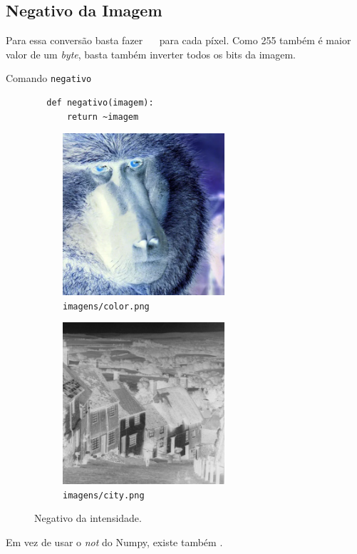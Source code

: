 \subsection{Negativo da Imagem}

Para essa conversão basta fazer ~~ para cada píxel. Como 255 também é maior valor de um \textit{byte}, basta também inverter todos os bits da imagem.

\begin{listing}[h]
    \caption{Comando \texttt{negativo}}

    \begin{verbatim}
        def negativo(imagem):
            return ~imagem
    \end{verbatim}
\end{listing}

\begin{figure}[h]
    \centering
    \begin{subfigure}{0.45\textwidth}
        \centering
        \includegraphics[width=6cm]{resultados/colorneg.png}
        \caption{\texttt{imagens/color.png}}
    \end{subfigure}%
    \begin{subfigure}{0.45\textwidth}
        \centering
        \includegraphics[width=6cm]{resultados/cityneg.png}
        \caption{\texttt{imagens/city.png}}
    \end{subfigure}

    \caption{Negativo da intensidade.}
\end{figure}

Em vez de usar o \textit{not} do Numpy, existe também  \autocite{ref:bitwise_not}.
